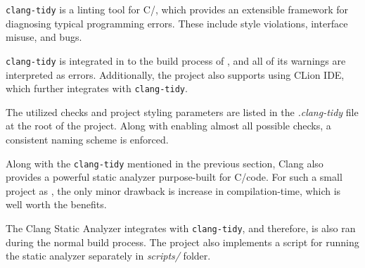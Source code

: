 \texttt{clang-tidy} is a linting tool for C/\CC, which provides an extensible
framework for diagnosing typical programming errors. These include style
violations, interface misuse, and bugs.

\texttt{clang-tidy} is integrated in to the build process of \pman,
and all of its warnings are interpreted as errors. Additionally, the project
also supports using CLion IDE, which further integrates with \texttt{clang-tidy}.

The utilized checks and project styling parameters are listed in the
\textit{.clang-tidy} file at the root of the project. Along with enabling
almost all possible checks, a consistent naming scheme is enforced.

Along with the \texttt{clang-tidy} mentioned in the previous section, Clang
also provides a powerful static analyzer purpose-built for C/\CC code. For such
a small project as \pman, the only minor drawback is increase in
compilation-time, which is well worth the benefits.

The Clang Static Analyzer integrates with \texttt{clang-tidy}, and therefore,
is also ran during the normal build process. The project also implements a
script for running the static analyzer separately in \textit{scripts/} folder.

